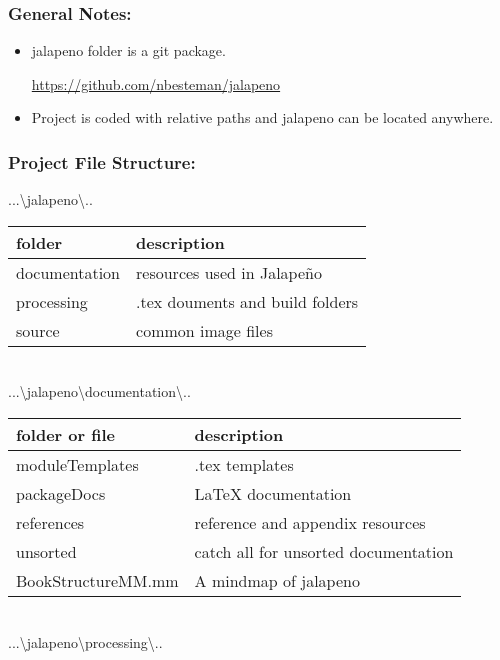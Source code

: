 \documentclass[class=book , crop=false]{standalone}
\begin{document}
\subsubsection{General Notes:}
\begin{itemize}
\item jalapeno folder is a git package.

\href{https://github.com/nbesteman/jalapeno}{https://github.com/nbesteman/jalapeno}

\item Project is coded with relative paths and jalapeno can be located anywhere.

\end{itemize}
\begin{adjmulticols}{1}{\innerMar}{\outerMar}
\subsubsection{Project File Structure:}
{\Large ...\textbackslash jalapeno\textbackslash..}\\
\begin{tabular}{p{6cm}| p{9cm} }
\footnotesize folder & {\footnotesize description} \\ \hline
documentation & resources used in Jalape\~no\\
processing & .tex douments and build folders\\
source & common image files\\
\end{tabular}
\bigskip\\
{\Large ...\textbackslash jalapeno\textbackslash documentation\textbackslash..}\\
\begin{tabular}{p{6cm} | p{9cm} }
\footnotesize folder or file & {\footnotesize description} \\ \hline
moduleTemplates & .tex templates\\
packageDocs & \LaTeX{} documentation\\
references & reference and appendix resources\\
unsorted & catch all for unsorted documentation\\
BookStructureMM.mm & A mindmap of jalapeno\\
\end{tabular}
\bigskip\\
{\Large ...\textbackslash jalapeno\textbackslash processing\textbackslash..}\\
\begin{tabular}{p{6cm}| p{9cm} }

\end{tabular}
\end{adjmulticols}
\end{document}
